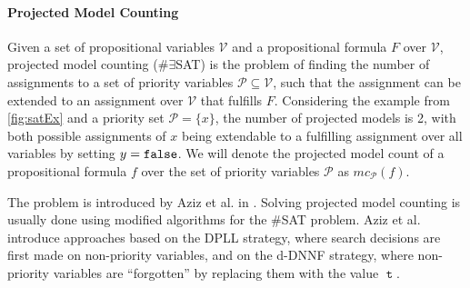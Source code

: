 \paragraph*{Projected Model Counting}
Given a set of propositional variables $\mathcal{V}$ and a propositional formula $F$ over $\mathcal{V}$, projected model counting (\#$\exists$SAT) is the problem of finding the number of assignments to a set of priority variables $\mathcal{P} \subseteq \mathcal{V}$, such that the assignment can be extended to an assignment over $\mathcal{V}$ that fulfills $F$. Considering the example from \ref{fig:satEx} and a priority set $\mathcal{P} = \{x\}$, the number of projected models is 2, with both possible assignments of $x$ being extendable to a fulfilling assignment over all variables by setting $y = \mathtt{false}$. We will denote the projected model count of a propositional formula $f$ over the set of priority variables $\mathcal{P}$ as $mc_\mathcal{P}(f)$.

The problem is introduced by Aziz et al. in \cite{aziz15}. Solving projected model counting is usually done using modified algorithms for the \#SAT problem. Aziz et al. introduce approaches based on the DPLL strategy, where search decisions are first made on non-priority variables, and on the d-DNNF strategy, where non-priority variables are \enquote{forgotten} by replacing them with the value $\mttt$. 